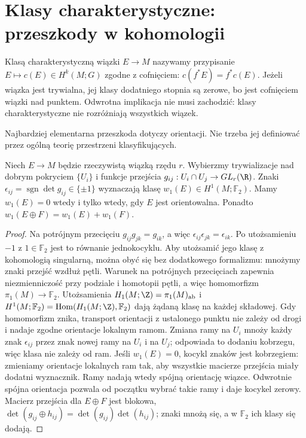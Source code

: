 \section{Klasy charakterystyczne: przeszkody w kohomologii}
\label{sec:klasy-char-16}

\begin{definicja}
Klasą charakterystyczną
wiązki $E\to M$ nazywamy
przypisanie $E\mapsto c(E)
\in H^k(M;G)$ zgodne
z cofnięciem:
$c(f^*E)=f^*c(E)$.
Jeżeli wiązka jest trywialna,
jej klasy dodatniego stopnia
są zerowe, bo jest cofnięciem
wiązki nad punktem.
Odwrotna implikacja
nie musi zachodzić:
klasy charakterystyczne
nie rozróżniają wszystkich
wiązek.
\end{definicja}

Najbardziej elementarna
przeszkoda dotyczy
orientacji. Nie trzeba
jej definiować przez
ogólną teorię przestrzeni
klasyfikujących.

\begin{stwierdzenie}
\label{prop:w1-orientacja-16}
Niech $E\to M$ będzie
rzeczywistą wiązką
rzędu $r$. Wybierzmy
trywializacje nad dobrym
pokryciem $\{U_i\}$ i
funkcje przejścia
$g_{ij}:U_i\cap U_j\to GL_r(\R)$.
Znaki
$\epsilon_{ij}=\operatorname{sgn}
\det g_{ij}\in\{\pm1\}$
wyznaczają klasę
$w_1(E)\in H^1(M;\mathbb F_2)$.
Mamy $w_1(E)=0$
wtedy i tylko wtedy,
gdy $E$ jest orientowalna.
Ponadto
$w_1(E\oplus F)=w_1(E)+w_1(F)$.
\end{stwierdzenie}
\begin{proof}
Na potrójnym przecięciu
$g_{ij}g_{jk}=g_{ik}$,
a więc
$\epsilon_{ij}\epsilon_{jk}
=\epsilon_{ik}$.
Po utożsamieniu $-1$
z $1\in\mathbb F_2$
jest to równanie jednokocyklu. Aby utożsamić jego
klasę z kohomologią singularną, można obyć się
bez dodatkowego formalizmu: mnożymy znaki przejść
wzdłuż pętli. Warunek na potrójnych przecięciach
zapewnia niezmienniczość przy podziale i homotopii
pętli, a więc homomorfizm $\pi_1(M)\to\mathbb F_2$.
Utożsamienia $H_1(M;\Z)=\pi_1(M)_{\mathrm{ab}}$
i $H^1(M;\mathbb F_2)=\operatorname{Hom}(H_1(M;\Z),\mathbb F_2)$
dają żądaną klasę na każdej składowej. Gdy homomorfizm
znika, transport orientacji z ustalonego punktu nie
zależy od drogi i nadaje zgodne orientacje lokalnym ramom.
Zmiana
ramy na $U_i$ mnoży
każdy znak $\epsilon_{ij}$
przez znak nowej ramy
na $U_i$ i na $U_j$;
odpowiada to dodaniu
kobrzegu, więc klasa
nie zależy od ram.
Jeśli $w_1(E)=0$,
kocykl znaków jest
kobrzegiem: zmieniamy
orientacje lokalnych
ram tak, aby wszystkie
macierze przejścia
miały dodatni wyznacznik.
Ramy nadają wtedy
spójną orientację
wiązce. Odwrotnie
spójna orientacja
pozwala od początku
wybrać takie ramy
i daje kocykel zerowy.
Macierz przejścia
dla $E\oplus F$
jest blokowa,
$\det(g_{ij}\oplus h_{ij})
=\det(g_{ij})\det(h_{ij})$;
znaki mnożą się, a
w $\mathbb F_2$
ich klasy się dodają.
\end{proof}

